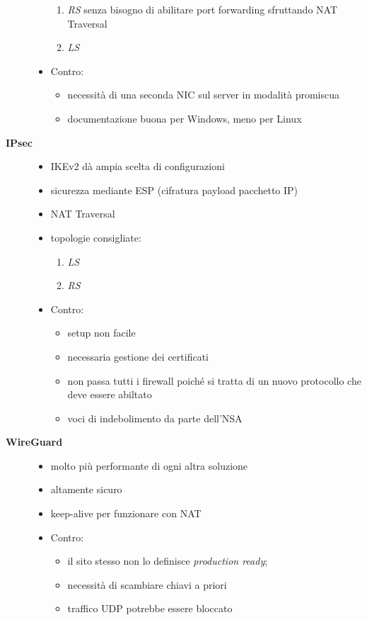 \begin{description}
\begin{itemize}
      \begin{enumerate}
        \item \textit{RS} senza bisogno di abilitare port forwarding sfruttando
        NAT Traversal
        \item \textit{LS}
      \end{enumerate}
      \item Contro:
      \begin{itemize}
        \item necessità di una seconda NIC sul server in modalità promiscua
        \item documentazione buona per Windows, meno per Linux
      \end{itemize}
    \end{itemize}
    \item[\textbf{IPsec}]
    \begin{itemize}
      \item IKEv2 dà ampia scelta di configurazioni
      \item sicurezza mediante ESP (cifratura payload pacchetto IP)
      \item NAT Traversal
      \item topologie consigliate:
      \begin{enumerate}
        \item \textit{LS}
        \item \textit{RS}
      \end{enumerate}
      \item Contro:
      \begin{itemize}
        \item setup non facile
        \item necessaria gestione dei certificati
        \item non passa tutti i firewall poiché si tratta di un nuovo protocollo
        che deve essere abiltato
        \item voci di indebolimento da parte dell'NSA
      \end{itemize}
    \end{itemize}
    \item[\textbf{WireGuard}]
    \begin{itemize}
      \item molto più performante di ogni altra soluzione
      \item altamente sicuro
      \item keep-alive per funzionare con NAT
      \item Contro:
      \begin{itemize}
        \item il sito stesso non lo definisce \textit{production ready};
        \item necessità di scambiare chiavi a priori
        \item traffico UDP potrebbe essere bloccato
      \end{itemize}
    \end{itemize}
\end{description}
